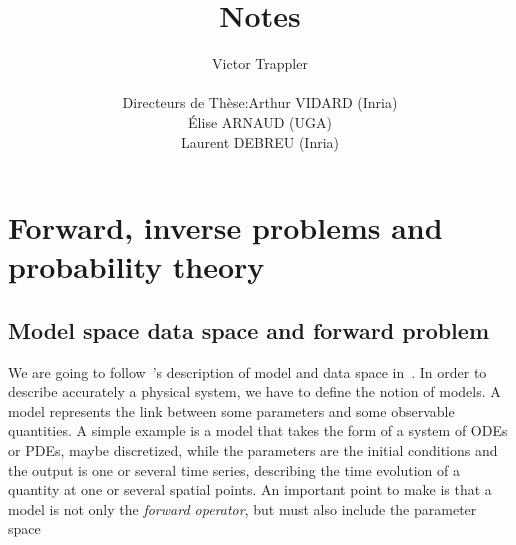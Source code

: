 \documentclass[a4paper,11pt]{article}
\theoremstyle{defi}
\numberwithin{thmCounter}{section}
\begin{document}
\title{Notes}

\author{Victor Trappler \\[1cm]
  \begin{tabular}{lr}
    Directeurs de Thèse: & Arthur VIDARD (Inria) \\
                        & Élise ARNAUD (UGA)\\
                        & Laurent DEBREU (Inria)
  \end{tabular}
}

\maketitle

\showthe\columnwidth
\section{Forward, inverse problems and probability theory}
\subsection{Model space data space and forward problem}
\label{sec:model_space_data_space}
We are going to follow~\citeauthor{tarantola_inverse_2005}'s description of model and data space in~\cite{tarantola_inverse_2005}.
In order to describe accurately a physical system, we have to define the notion of models. A model represents the link between some parameters and some observable quantities. A simple example is a model that takes the form of a system of ODEs or PDEs, maybe discretized, while the parameters are the initial conditions and the output is one or several time series, describing the time evolution of a quantity at one or several spatial points. An important point to make is that a model is not only the \emph{forward operator}, but must also include the parameter space
\end{document}
